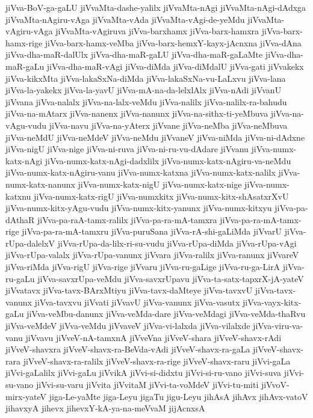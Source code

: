 {jiVva-BoV-ga-gaLU
jiVvaMta-dashe-yalilx
jiVvaMta-nAgi
jiVvaMta-nAgi-dAdxga
jiVvaMta-nAgiru-vAga
jiVvaMta-vAda
jiVvaMta-vAgi-de-yeMdu
jiVvaMta-vAgiru-vAga
jiVvaMta-vAgiruva
jiVva-barxhamx
jiVva-barx-hamxra
jiVva-barx-hamx-rige
jiVva-barx-hamx-veMba
jiVva-barx-hemxY-kayx-jAcnxna
jiVva-dAna
jiVva-dha-maR-dalUlx
jiVva-dha-maR-gaLU
jiVva-dha-maR-gaLaMte
jiVva-dha-maR-gaLu
jiVva-dha-maR-vAgi
jiVva-diMda
jiVva-diMdalU
jiVva-gati
jiVvakekx
jiVva-kikxMta
jiVva-lakaSxNa-diMda
jiVva-lakaSxNa-vu-LaLxvu
jiVva-lana
jiVva-la-yakekx
jiVva-la-yavU
jiVva-mA-na-da-lelxlAlx
jiVva-nAdi
jiVvanU
jiVvana
jiVva-nalalx
jiVva-na-lalx-veMdu
jiVva-nalilx
jiVva-nalilx-ra-bahudu
jiVva-na-mAtarx
jiVva-nanenx
jiVva-nanunx
jiVva-na-sithx-ti-yeMbuva
jiVva-na-vAgu-vudu
jiVva-navu
jiVva-na-yAterx
jiVvane
jiVva-neMba
jiVva-neMbuva
jiVva-neMdU
jiVva-neMdeV
jiVva-neMdu
jiVvaneV
jiVva-niMda
jiVva-ni-dAdxne
jiVva-nigU
jiVva-nige
jiVva-ni-ruva
jiVva-ni-ru-vu-dAdare
jiVvanu
jiVva-numx-katx-nAgi
jiVva-numx-katx-nAgi-dadxlilx
jiVva-numx-katx-nAgiru-va-neMdu
jiVva-numx-katx-nAgiru-vanu
jiVva-numx-katxna
jiVva-numx-katx-nalilx
jiVva-numx-katx-nanunx
jiVva-numx-katx-nigU
jiVva-numx-katx-nige
jiVva-numx-katxnu
jiVva-numx-katx-rigU
jiVva-numxkitx
jiVva-numx-kitx-shAsatxrXvU
jiVva-numx-kitx-yAgu-vudu
jiVva-numx-kitx-yanunx
jiVva-numx-kitxyu
jiVva-pa-dAthaR
jiVva-pa-raA-tamx-ralilx
jiVva-pa-ra-mA-tamxra
jiVva-pa-ra-mA-tamx-rige
jiVva-pa-ra-mA-tamxru
jiVva-puruSana
jiVva-rA-shi-gaLiMda
jiVvarU
jiVva-rUpa-dalelxV
jiVva-rUpa-da-lilx-ri-su-vudu
jiVva-rUpa-diMda
jiVva-rUpa-vAgi
jiVva-rUpa-valalx
jiVva-rUpa-vanunx
jiVvara
jiVva-ralilx
jiVva-ranunx
jiVvareV
jiVva-riMda
jiVva-rigU
jiVva-rige
jiVvaru
jiVva-ru-gaLige
jiVva-ru-ga-LirA
jiVva-ru-gaLu
jiVva-savxrUpa-veMdu
jiVva-savxrUpavu
jiVva-ta-satx-tapxrX-jA-yateV
jiVvatavx
jiVva-tavx-BArxMtiyu
jiVva-tavx-daMteye
jiVva-tavxvU
jiVva-tavx-vanunx
jiVva-tavxvu
jiVvati
jiVvavU
jiVva-vanunx
jiVva-vasutx
jiVva-vayx-kitx-gaLu
jiVva-veMbu-danunx
jiVva-veMda-dare
jiVva-veMdagi
jiVva-veMda-thaRvu
jiVva-veMdeV
jiVva-veMdu
jiVvaveV
jiVva-vi-lalxda
jiVva-vilalxde
jiVva-viru-va-vanu
jiVvavu
jiVveV-nA-tamxnA
jiVveVna
jiVveV-shara
jiVveV-shavx-rAdi
jiVveV-shavxra
jiVveV-shavx-ra-BeVda-vAdi
jiVveV-shavx-ra-gaLa
jiVveV-shavx-rara
jiVveV-shavx-ra-ralilx
jiVveV-shavx-ra-rige
jiVveV-shavx-raru
jiVvi-gaLa
jiVvi-gaLalilx
jiVvi-gaLu
jiVvikA
jiVvi-si-didxtu
jiVvi-si-ru-vano
jiVvi-suva
jiVvi-su-vano
jiVvi-su-varu
jiVvita
jiVvitaM
jiVvi-ta-voMdeV
jiVvi-tu-miti
jiVvoV-mirx-yateV
jiga-Le-yaMte
jiga-Leyu
jigaTu
jigu-Leyu
jihAsA
jihAvx
jihAvx-vatoV
jihavxyA
jihevx
jihevxY-kA-ya-na-meVvaM
jijAcnxsA
}
